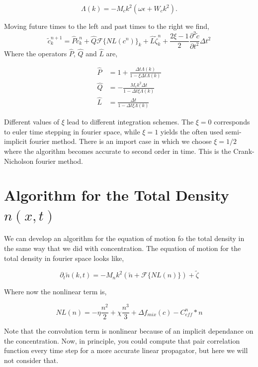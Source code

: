 \documentclass[11pt]{article}
\newcommand{\f}{\frac}
\newcommand{\D}{\Delta}
\begin{document}
\begin{equation}
\Lambda(k) = -M_c k^2\left(\omega\epsilon + W_c k^2\right).
\end{equation}

Moving future times to the left and past times to the right we find, 
\begin{equation}
\tilde{c}_k^{n+1} = \hat{P}\tilde{c}_k^n + \hat{Q}\mathcal{F}\lbrace NL(c^n)\rbrace_k + \hat{L}\tilde{\zeta}_k^n + \frac{2\xi - 1}{2}\frac{\partial^2 \tilde{c}}{\partial t^2}\Delta t^2
\end{equation}
Where the operators $\hat{P}$, $\hat{Q}$ and $\hat{L}$ are,

\begin{align}
\hat{P} &= 1 + \frac{\Delta t \Lambda(k)}{1 - \xi\Delta t \Lambda(k)}  \\
\hat{Q} &= -\frac{M_c k^2 \Delta t}{1 - \Delta t \xi \Lambda(k)} \\
\hat{L} &= \frac{\Delta t}{1 - \Delta t \xi \Lambda(k)} 
\end{align}

Different values of $\xi$ lead to different integration schemes. The $\xi = 0$ corresponds to euler time stepping in fourier space, while $\xi = 1$ yields the often used semi-implicit fourier method. There is an import case in which we choose $\xi = 1/2$ where the algorithm becomes accurate to second order in time. This is the Crank-Nicholson fourier method. 

\section{Algorithm for the Total Density $n(x,t)$}

We can develop an algorithm for the equation of motion fo the total density in the same way that we did with concentration. The equation of motion for the total density in fourier space looks like, 

\begin{equation}
\partial_t \tilde{n}(k, t) = -M_n k^2 \left(\tilde{n} + \mathcal{F}\lbrace NL(n)\rbrace\right) + \tilde{\zeta}
\end{equation}

Where now the nonlinear term is, 

\begin{equation}
NL(n) = -\eta \f{n^2}{2} + \chi \f{n^3}{3}  + \D f_{mix}(c) - C_{eff}^n \ast n  
\end{equation}

Note that the convolution term is nonlinear because of an implicit dependance on the concentration. Now, in principle, you could compute that pair correlation function every time step for a more accurate linear propagator, but here we will not consider that. 
\end{document}
